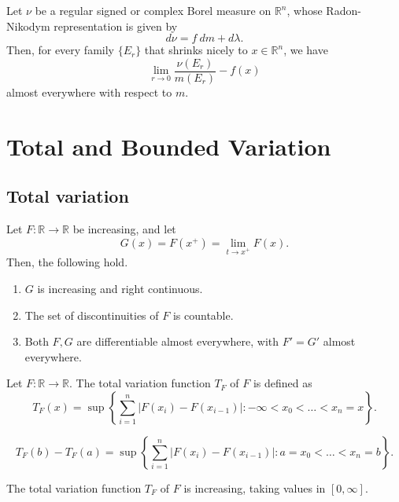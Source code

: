 \documentclass[11pt]{article}
\newcommand{\R}{\mathbb{R}}
\theoremstyle{definition}
\theoremstyle{remark}
\begin{document}
    \begin{theorem}
        Let $\nu$ be a regular signed or complex Borel measure on $\R^n$, whose
        Radon-Nikodym representation is given by \[
            d\nu = f\:dm + d\lambda.
        \] Then, for every family $\{E_r\}$ that shrinks nicely to $x \in \R^n$, we
        have \[
            \lim_{r \to 0} \frac{\nu(E_r)}{m(E_r)} - f(x)
        \] almost everywhere with respect to $m$.
    \end{theorem}



    \section{Total and Bounded Variation}

    \subsection{Total variation}

    \begin{theorem}
        Let $F\colon \R \to \R$ be increasing, and let \[
            G(x) = F(x^+) = \lim_{t \to x^+} F(x).
        \] Then, the following hold. \begin{enumerate}
            \item $G$ is increasing and right continuous.
            \item The set of discontinuities of $F$ is countable.
            \item Both $F, G$ are differentiable almost everywhere, with $F' = G'$
            almost everywhere.
        \end{enumerate}
    \end{theorem}

    \begin{definition}
        Let $F\colon \R \to \R$. The total variation function $T_F$ of $F$ is defined
        as \[
            T_F(x) = \sup\left\{\sum_{i = 1}^n |F(x_i) - F(x_{i - 1})| : -\infty <
            x_0 < \dots < x_n = x\right\}.
        \]
    \end{definition}

    \begin{lemma}
        \[
            T_F(b) - T_F(a) = \sup\left\{\sum_{i = 1}^n |F(x_i) - F(x_{i - 1})| : a =
            x_0 < \dots < x_n = b\right\}.
        \]
    \end{lemma}

    \begin{lemma}
        The total variation function $T_F$ of $F$ is increasing, taking values in
        $[0, \infty]$.
    \end{lemma}
\end{document}

